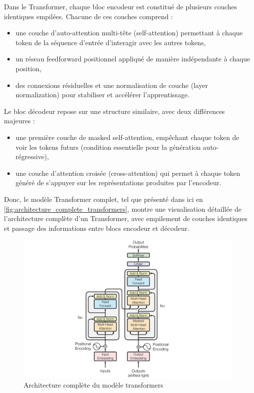 Dans le Transformer, chaque bloc encodeur est constitué de plusieurs couches identiques empilées. Chacune de ces couches comprend : 
\begin{itemize} 
    \item une couche d’auto-attention multi-tête (self-attention) permettant à chaque token de la séquence d’entrée d’interagir avec les autres tokens, 
    \item un réseau feedforward positionnel appliqué de manière indépendante à chaque position, 
    \item des connexions résiduelles et une normalisation de couche (layer normalization) pour stabiliser et accélérer l’apprentissage. 
\end{itemize}

Le bloc décodeur repose sur une structure similaire, avec deux différences majeures : 
\begin{itemize} 
    \item une première couche de masked self-attention, empêchant chaque token de voir les tokens futurs (condition essentielle pour la génération auto-régressive), 
    \item une couche d’attention croisée (cross-attention) qui permet à chaque token généré de s’appuyer sur les représentations produites par l’encodeur.
\end{itemize}

Donc, le modèle Transformer complet, tel que présenté dans \citep{vaswani2017attention} ici en \autoref{fig:architecture_complete_transformers}, montre une visualisation détaillée de l’architecture complète d’un Transformer, avec empilement de couches identiques et passage des informations entre blocs encodeur et décodeur.

\begin{figure}[H]
    \centering
    \includegraphics[scale=0.3]{images/transformers.png}
    \caption{Architecture complète du modèle transformers}
    \label{fig:architecture_complete_transformers}
\end{figure}

